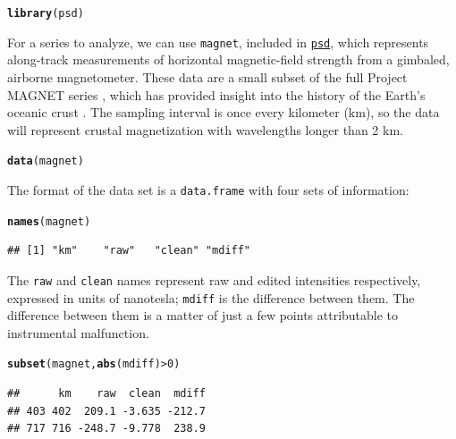 \documentclass[10pt]{article}\usepackage[]{graphicx}\usepackage[]{color}
\makeatletter
\newcommand{\hlnum}[1]{\textcolor[rgb]{0.686,0.059,0.569}{#1}}%
\newcommand{\hlopt}[1]{\textcolor[rgb]{0,0,0}{#1}}%
\newcommand{\hlstd}[1]{\textcolor[rgb]{0.345,0.345,0.345}{#1}}%
\newcommand{\hlkwd}[1]{\textcolor[rgb]{0.737,0.353,0.396}{\textbf{#1}}}%
\newenvironment{kframe}{%
 \def\at@end@of@kframe{}%
 \ifinner\ifhmode%
  \def\at@end@of@kframe{\end{minipage}}%
  \begin{minipage}{\columnwidth}%
 \fi\fi%
 \def\FrameCommand##1{\hskip\@totalleftmargin \hskip-\fboxsep
 \colorbox{shadecolor}{##1}\hskip-\fboxsep
     \hskip-\linewidth \hskip-\@totalleftmargin \hskip\columnwidth}%
 \MakeFramed {\advance\hsize-\width
   \@totalleftmargin\z@ \linewidth\hsize
   \@setminipage}}%
 {\par\unskip\endMakeFramed%
 \at@end@of@kframe}
\newenvironment{knitrout}{}{} %
\newcommand{\Rcmd}[1]{\texttt{#1}}
\newcommand{\psd}[0]{\href{http://abarbour.github.com/psd/}{\color{blue}\Rcmd{psd}}}
\makeatother
\begin{document}
\begin{knitrout}
\color{fgcolor}\begin{kframe}
\begin{alltt}
\hlkwd{library}\hlstd{(psd)}
\end{alltt}


{\ttfamily\noindent\itshape\color{messagecolor}{\#\# Loading required package: fftw\\\#\# Loaded psd (0.4.3) -- Adaptive multitaper spectrum estimation.}}\end{kframe}
\end{knitrout}
For a series to analyze, we can use \Rcmd{magnet}, included in \psd{},
which represents along-track measurements
of horizontal magnetic-field strength from a gimbaled, airborne magnetometer.
These data are a small subset of the full Project MAGNET series \citep{coleman1992},
which has provided insight into
the history of the Earth's oceanic crust 
\citep{parker1997, obrien1999, korte2002}.
The sampling interval is
once every kilometer (km), so the data will represent
crustal magnetization with wavelengths longer than 2 km.
\begin{knitrout}
\color{fgcolor}\begin{kframe}
\begin{alltt}
\hlkwd{data}\hlstd{(magnet)}
\end{alltt}
\end{kframe}
\end{knitrout}
The format of the data set is a \Rcmd{data.frame} with four
sets of information:
\begin{knitrout}
\color{fgcolor}\begin{kframe}
\begin{alltt}
\hlkwd{names}\hlstd{(magnet)}
\end{alltt}
\begin{verbatim}
## [1] "km"    "raw"   "clean" "mdiff"
\end{verbatim}
\end{kframe}
\end{knitrout}
The \Rcmd{raw} and \Rcmd{clean} names represent raw
and edited intensities respectively, expressed in units of nanotesla; 
\Rcmd{mdiff} is the difference between them.
The difference between them is a matter of just a few points
attributable to instrumental malfunction. 
\begin{knitrout}
\color{fgcolor}\begin{kframe}
\begin{alltt}
\hlkwd{subset}\hlstd{(magnet,} \hlkwd{abs}\hlstd{(mdiff)}\hlopt{>}\hlnum{0}\hlstd{)}
\end{alltt}
\begin{verbatim}
##      km    raw  clean  mdiff
## 403 402  209.1 -3.635 -212.7
## 717 716 -248.7 -9.778  238.9
\end{verbatim}
\end{kframe}
\end{knitrout}
\end{document}
